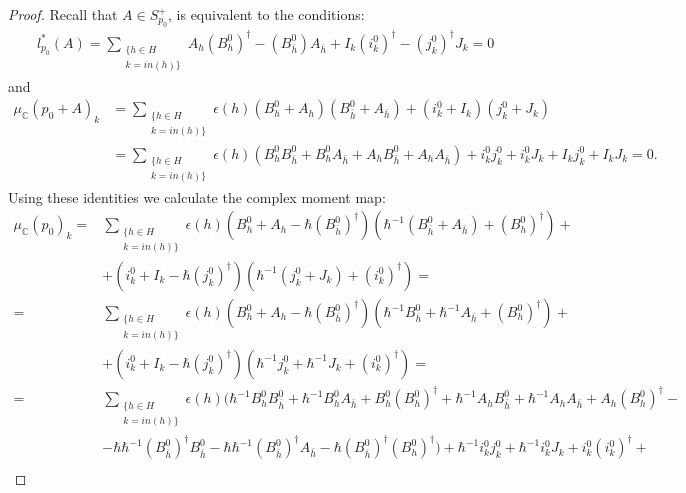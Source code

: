 \documentclass[12pt,oneside,reqno]{amsart}
\theoremstyle{definition}
\numberwithin{equation}{section}
\numberwithin{theorem}{section}
\newcommand{\C}{\mathbb{C}}
\renewcommand{\d}[1]{\ensuremath{\operatorname{d}\!{#1}}}
\renewcommand{\d}{\dagger}
\newcommand{\hb}{\bar{h}}
\begin{document}
%
\begin{proof}
    Recall that $A \in S_{p_0}^+$, is equivalent to the conditions: 
    \begin{equation} \label{1}
    \begin{split}
&l_{p_0}^*(A)=
\sum\limits_{\substack{\{h \in H\\k=in(h)\}}}A_h (B_h^0)^\d -(B_{\bar{h}} ^0)A_{\bar{h}}+I_k(i_k^0)^\d -(j_k^0)^\d J_k=0  
    \end{split}
    \end{equation}
%
and 
%
    \begin{equation}\label{2}
        \begin{split}
            \mu_\C(p_0+A)_k&=\sum\limits_{\substack{\{h \in H\\k=in(h)\}}} \epsilon(h)(B_h^0+A_h)(B_{\hb}^0 +A_{\hb})+(i_k^0+I_k)(j_k^0+J_k)   \\
            &=\sum\limits_{\substack{\{h \in H\\k=in(h)\}}}\epsilon(h)(B_h^0 B_{\hb}^0+B_h^0A_{\hb} +A_hB_{\hb}^0+A_hA_{\hb})+i_k^0 j_k^0 +i_k^0 J_k+I_k j_k^0 +I_kJ_k= 0.
        \end{split}
    \end{equation}
%
Using these identities we calculate the complex moment map:
%
\begin{equation*}
\begin{split}
    \mu_\C(p_0)_k=&\sum\limits_{\substack{\{h\in H\\k=in(h)\}}} \epsilon(h) (B_h^0+A_h-\hbar (B_{\hb}^0)^\d )(\hbar ^{-1}(B_{\hb}^0+A_{\hb})+(B_h^0)^\d)+\\
    &+(i_k^0 +I_k-\hbar (j_k^0)^\d )(\hbar ^{-1}(j_k^0+J_k)+(i_k^0)^\d)= \\
    =&\sum\limits_{\substack{\{h\in H\\k=in(h)\}}} \epsilon(h)(B_h^0+A_h-\hbar (B_{\hb}^0)^\d )(\hbar ^{-1} B_{\hb}^0+\hbar ^{-1} A_{\hb} +(B_h^0)^\d )+\\
    &+(i_k^0 +I_k-\hbar (j_k^0)^\d )(\hbar^{-1} j_k^0 +\hbar ^{-1}J_k+(i_k^0)^\d)= \\
    =&\sum\limits_{\substack{\{h\in H\\k=in(h)\}}} \epsilon(h)(\hbar ^{-1} B_h^0 B_{\hb}^0+\hbar ^{-1} B_h^0A_{\hb}+B_h^0(B_h^0)^\d +\hbar^{-1} A_hB_{\hb}^0+\hbar ^{-1} A_hA_{\hb}+A_h(B_h^0)^\d- \\
    &- \hbar \hbar^{-1}(B_{\hb}^0)^\d B_{\hb}^0-\hbar \hbar^{-1}(B_{\hb}^0)^\d A_{\hb}-\hbar (B_{\hb}^0)^\d (B_h^0)^\d) +\hbar ^{-1}i_k^0 j_k^0+\hbar^{-1} i_k^0 J_k +i_k^0 (i_k^0)^\d +\\

\end{split}
\end{equation*}
\end{proof}
\end{document}
